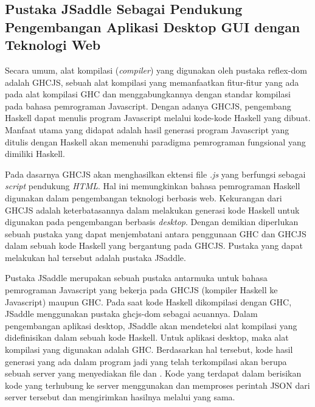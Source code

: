 \documentclass[pi.tex]{subfile}
\begin{document}
\subsection{Pustaka JSaddle Sebagai Pendukung Pengembangan Aplikasi Desktop GUI dengan Teknologi Web}\hspace{5pt}
Secara umum, alat kompilasi (\emph{compiler})  yang digunakan oleh pustaka reflex-dom adalah GHCJS, sebuah alat kompilasi yang memanfaatkan fitur-fitur yang ada pada alat kompilasi GHC dan menggabungkannya dengan standar kompilasi pada bahasa pemrograman Javascript. Dengan adanya GHCJS, pengembang Haskell dapat menulis program Javascript melalui kode-kode Haskell yang dibuat. Manfaat utama yang didapat adalah hasil generasi program Javascript yang ditulis dengan Haskell akan memenuhi paradigma pemrograman fungsional yang dimiliki Haskell.

\hspace{5pt}Pada dasarnya GHCJS akan menghasilkan ektensi file \emph{.js} yang berfungsi sebagai \emph{script} pendukung \emph{HTML}. Hal ini memungkinkan bahasa pemrograman Haskell digunakan dalam pengembangan teknologi berbasis web. Kekurangan dari GHCJS adalah keterbatasannya dalam melakukan generasi kode Haskell untuk digunakan pada pengembangan berbasis \emph{desktop}. Dengan demikian diperlukan sebuah pustaka yang dapat menjembatani antara penggunaan GHC dan GHCJS dalam sebuah kode Haskell yang bergantung pada GHCJS. Pustaka yang dapat melakukan hal tersebut adalah pustaka JSaddle.

\hspace{5pt}Pustaka JSaddle merupakan sebuah pustaka antarmuka untuk bahasa pemrograman Javascript yang bekerja pada GHCJS (kompiler Haskell ke Javascript) maupun GHC. Pada saat kode Haskell dikompilasi dengan GHC, JSaddle menggunakan pustaka ghcjs-dom sebagai acuannya. Dalam pengembangan aplikasi desktop, JSaddle akan mendeteksi alat kompilasi yang didefinisikan dalam sebuah kode Haskell. Untuk aplikasi desktop, maka alat kompilasi yang digunakan adalah GHC. Berdasarkan hal tersebut, kode hasil generasi yang ada dalam program jadi yang telah terkompilasi akan berupa sebuah server yang menyediakan file  dan . Kode yang terdapat dalam  berisikan kode yang terhubung ke server menggunakan  dan memproses perintah JSON dari server tersebut dan mengirimkan hasilnya melalui  yang sama.
\end{document}

